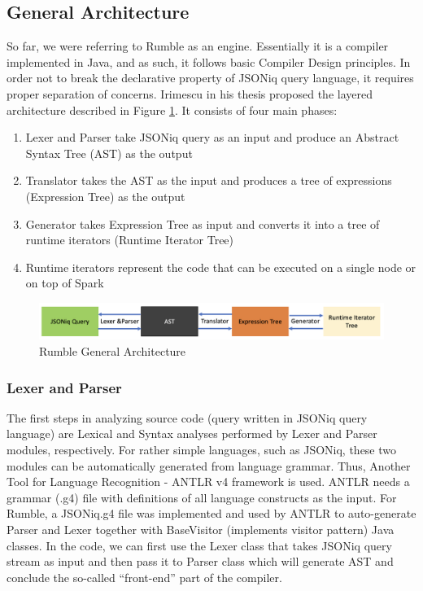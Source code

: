 \subsection{General Architecture}
\label{sec:RumbleArchitecture}
So far, we were referring to Rumble as an engine. Essentially it is a compiler implemented in Java, and as such, it follows basic Compiler Design principles. In order not to break the declarative property of JSONiq query language, it requires proper separation of concerns. Irimescu in his thesis \cite{RumbleThesis} proposed the layered architecture described in Figure \ref{fig:Rumble_General_Architecture}. It consists of four main phases:
\begin{enumerate}
	\item Lexer and Parser take JSONiq query as an input and produce an Abstract Syntax Tree (AST) as the output 
	\item Translator takes the AST as the input and produces a tree of expressions (Expression Tree) as the output
	\item Generator takes Expression Tree as input and converts it into a tree of runtime iterators (Runtime Iterator Tree)
	\item Runtime iterators represent the code that can be executed on a single node or on top of Spark
\end{enumerate} 

\begin{figure}[h!]
	\includegraphics[width=\linewidth]{parsing_architecture.png}
	\caption{Rumble General Architecture}
	\label{fig:Rumble_General_Architecture}
\end{figure}

\subsubsection{Lexer and Parser}
\label{sec:RumbleLexerParser}
The first steps in analyzing source code (query written in JSONiq query language) are Lexical and Syntax analyses performed by Lexer and Parser modules, respectively. For rather simple languages, such as JSONiq, these two modules can be automatically generated from language grammar. Thus, Another Tool for Language Recognition - ANTLR v4 framework \cite{ANTLR} is used. ANTLR needs a grammar (.g4) file with definitions of all language constructs as the input. For Rumble, a JSONiq.g4 file was implemented and used by ANTLR to auto-generate Parser and Lexer together with BaseVisitor (implements visitor pattern) Java classes. In the code, we can first use the Lexer class that takes JSONiq query stream as input and then pass it to Parser class which will generate AST and conclude the so-called ``front-end'' part of the compiler.

